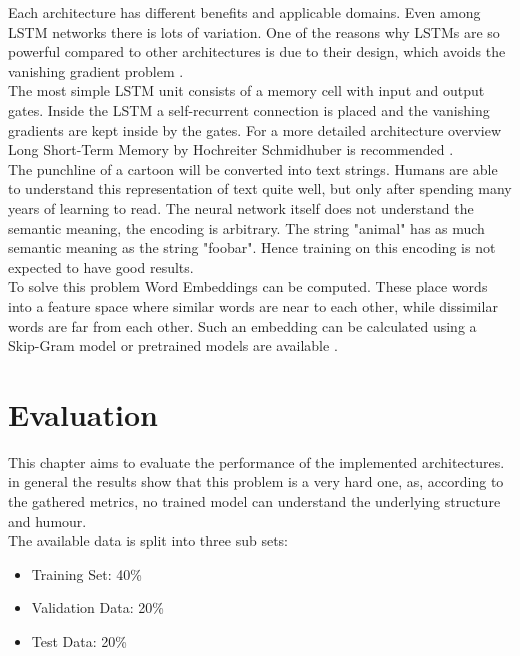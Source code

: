 \documentclass[draft,final,oneside]{vutinfth} %
\begin{document}
Each architecture has different benefits and applicable domains. Even among LSTM networks there is lots of variation. One of the reasons why LSTMs are so powerful compared to other architectures is due to their design, which avoids the vanishing gradient problem \cite {vanishinggradient}.\\

The most simple LSTM unit consists of a memory cell with input and output gates. Inside the LSTM a self-recurrent connection is placed and the vanishing gradients are kept inside by the gates. For a more detailed architecture overview Long Short-Term Memory by Hochreiter Schmidhuber is recommended \cite{hochreiter}. \\

The punchline of a cartoon will be converted into text strings. Humans are able to understand this representation of text quite well, but only after spending many years of learning to read. The neural network itself does not understand the semantic meaning, the encoding is arbitrary. The string "animal" has as much semantic meaning as the string "foobar". Hence training on this encoding is not expected to have good results. \\

To solve this problem Word Embeddings can be computed. These place words into a feature space where similar words are near to each other, while dissimilar words are far from each other. Such an embedding can be calculated using a Skip-Gram model \cite{wordembedding} or pretrained models are available \cite{pennington2014glove}.
\fi

\fi

\chapter{Evaluation}

This chapter aims to evaluate the performance of the implemented architectures. in
general the results show that this problem is a very hard one, as, according to the
gathered metrics, no trained model can understand the underlying structure and humour. \\

The available data is split into three sub sets:

\begin{itemize}
\item Training Set: 40\%
\item Validation Data: 20\%
\item Test Data: 20\%
\end{itemize}
\end{document}
